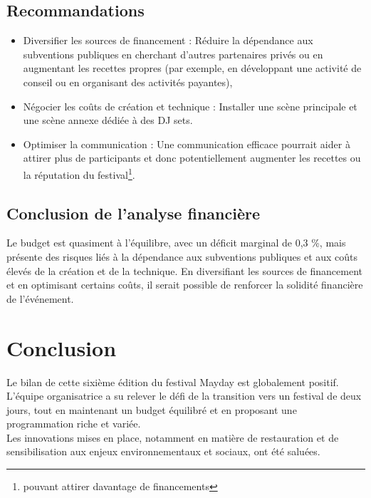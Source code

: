 \documentclass[12pt,a4paper]{report}
\begin{document}
\section{Recommandations}
\begin{itemize}
\item Diversifier les sources de financement : Réduire la dépendance aux subventions publiques en cherchant d'autres partenaires privés ou en augmentant les recettes propres (par exemple, en développant une activité de conseil ou en organisant des activités payantes),
\item Négocier les coûts de création et technique : Installer une scène principale et une scène annexe dédiée à des DJ sets.
\item Optimiser la communication : Une communication efficace pourrait aider à attirer plus de participants et donc potentiellement augmenter les recettes ou la réputation du festival\footnote{pouvant attirer davantage de financements}.
\end{itemize}

\section{Conclusion de l'analyse financière}
Le budget est quasiment à l'équilibre, avec un déficit marginal de 0,3 \%, mais présente des risques liés à la dépendance aux subventions publiques et aux coûts élevés de la création et de la technique. En diversifiant les sources de financement et en optimisant certains coûts, il serait possible de renforcer la solidité financière de l'événement.

\chapter{Conclusion}

Le bilan de cette sixième édition du festival Mayday est globalement positif.\\

L’équipe organisatrice a su relever le défi de la transition vers un festival de deux jours, tout en maintenant un budget équilibré et en proposant une programmation riche et variée.\\

Les innovations mises en place, notamment en matière de restauration et de sensibilisation aux enjeux environnementaux et sociaux, ont été saluées.\\
\end{document}
